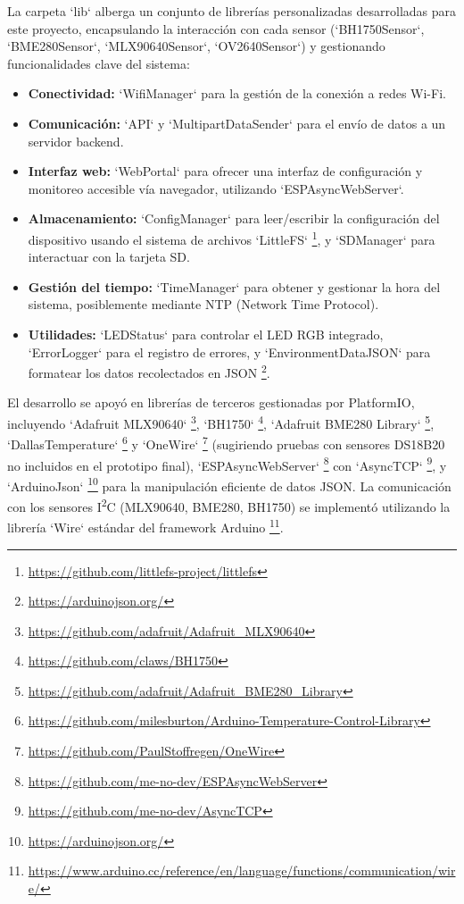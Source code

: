 La carpeta `lib` alberga un conjunto de librerías personalizadas desarrolladas para este proyecto, encapsulando la interacción con cada sensor (`BH1750Sensor`, `BME280Sensor`, `MLX90640Sensor`, `OV2640Sensor`) y gestionando funcionalidades clave del sistema:
\begin{itemize}
    \item \textbf{Conectividad:} `WifiManager` para la gestión de la conexión a redes Wi-Fi.
    \item \textbf{Comunicación:} `API` y `MultipartDataSender` para el envío de datos a un servidor backend.
    \item \textbf{Interfaz web:} `WebPortal` para ofrecer una interfaz de configuración y monitoreo accesible vía navegador, utilizando `ESPAsyncWebServer`.
    \item \textbf{Almacenamiento:} `ConfigManager` para leer/escribir la configuración del dispositivo usando el sistema de archivos `LittleFS` \footnote{\url{https://github.com/littlefs-project/littlefs}}, y `SDManager` para interactuar con la tarjeta SD.
    \item \textbf{Gestión del tiempo:} `TimeManager` para obtener y gestionar la hora del sistema, posiblemente mediante NTP (Network Time Protocol).
    \item \textbf{Utilidades:} `LEDStatus` para controlar el LED RGB integrado, `ErrorLogger` para el registro de errores, y `EnvironmentDataJSON` para formatear los datos recolectados en JSON \footnote{\url{https://arduinojson.org/}}.
\end{itemize}

El desarrollo se apoyó en librerías de terceros gestionadas por PlatformIO, incluyendo `Adafruit MLX90640` \footnote{\url{https://github.com/adafruit/Adafruit_MLX90640}}, `BH1750` \footnote{\url{https://github.com/claws/BH1750}}, `Adafruit BME280 Library` \footnote{\url{https://github.com/adafruit/Adafruit_BME280_Library}}, `DallasTemperature` \footnote{\url{https://github.com/milesburton/Arduino-Temperature-Control-Library}} y `OneWire` \footnote{\url{https://github.com/PaulStoffregen/OneWire}} (sugiriendo pruebas con sensores DS18B20 no incluidos en el prototipo final), `ESPAsyncWebServer` \footnote{\url{https://github.com/me-no-dev/ESPAsyncWebServer}} con `AsyncTCP` \footnote{\url{https://github.com/me-no-dev/AsyncTCP}}, y `ArduinoJson` \footnote{\url{https://arduinojson.org/}} para la manipulación eficiente de datos JSON. La comunicación con los sensores I\textsuperscript{2}C (MLX90640, BME280, BH1750) se implementó utilizando la librería `Wire` estándar del framework Arduino \footnote{\url{https://www.arduino.cc/reference/en/language/functions/communication/wire/}}.

